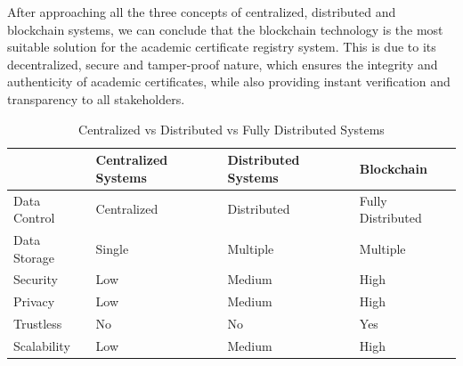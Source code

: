 After approaching all the three concepts of centralized, distributed and blockchain systems, we can conclude that the blockchain technology is the most suitable solution for the academic certificate registry system.
This is due to its decentralized, secure and tamper-proof nature, which ensures the integrity and authenticity of academic certificates, while also providing instant verification and transparency to all stakeholders.

\begin{table}[h]\label{tab:centralized-vs-distributed-vs-blockchain}
    \centering
    \renewcommand{\arraystretch}{1.5} %
    \begin{tabular}{|l|l|l|l|}
        \hline
                     & \textbf{Centralized Systems} & \textbf{Distributed Systems} & \textbf{Blockchain} \\ \hline
        Data Control & Centralized                  & Distributed                  & Fully Distributed   \\ \hline
        Data Storage & Single                       & Multiple                     & Multiple            \\ \hline
        Security     & Low                          & Medium                       & High                \\ \hline
        Privacy      & Low                          & Medium                       & High                \\ \hline
        Trustless    & No                           & No                           & Yes                 \\ \hline
        Scalability  & Low                          & Medium                       & High                \\ \hline
    \end{tabular}
    \caption{Centralized vs Distributed vs Fully Distributed Systems}
    \label{tab:comparison}
\end{table}